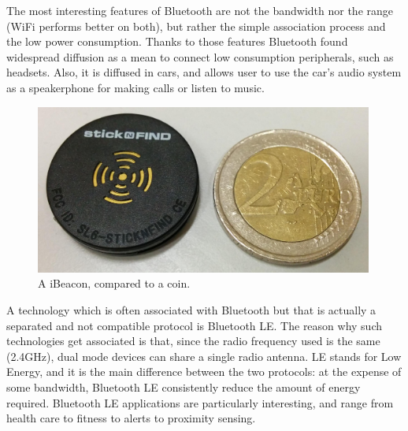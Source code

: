 \documentclass[12pt,a4paper,twoside,openright]{book}
\begin{document}
The most interesting features of Bluetooth are not the bandwidth nor the range (WiFi performs better on both), but rather the simple association process and the low power consumption.
%
Thanks to those features Bluetooth found widespread diffusion as a mean to connect low consumption peripherals, such as headsets.
%
Also, it is diffused in cars, and allows user to use the car's audio system as a speakerphone for making calls or listen to music.

\begin{figure}
	\centering
	\includegraphics[width=0.99\textwidth]{img/ibeacon}
	\caption{
		A iBeacon, compared to a  coin.
	}
	\label{img:ibeacon}
\end{figure}

A technology which is often associated with Bluetooth but that is actually a separated and not compatible protocol is Bluetooth LE.
%
The reason why such technologies get associated is that, since the radio frequency used is the same (2.4GHz), dual mode devices can share a single radio antenna.
%
LE stands for Low Energy, and it is the main difference between the two protocols: at the expense of some bandwidth, Bluetooth LE consistently reduce the amount of energy required.
%
Bluetooth LE applications are particularly interesting, and range from health care to fitness to alerts to proximity sensing.
\end{document}
